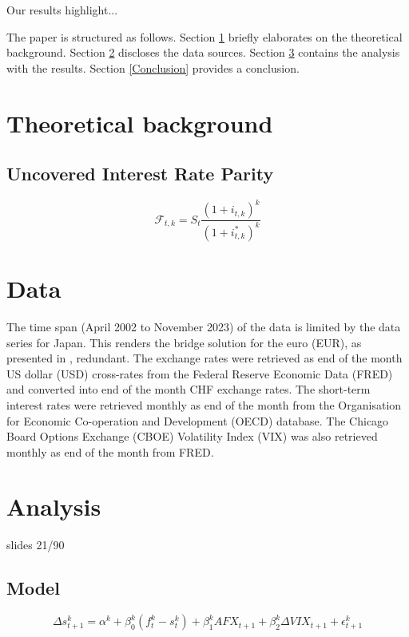 \documentclass[a4paper,11pt,oneside]{article}
\begin{document}


Our results highlight...\par

The paper is structured as follows. Section \ref{Theoretical background} briefly elaborates on the theoretical background. Section \ref{Data} discloses the data sources. Section \ref{Analysis} contains the analysis with the results. Section \ref{Conclusion} provides a conclusion.\par 

  
\section{Theoretical background}\label{Theoretical background}
\subsection{Uncovered Interest Rate Parity}\label{Uncovered Interest Rate Parity}
\begin{equation}\label{1}
\mathcal{F}_{t,k}=S_{t}\frac{(1+i_{t,k})^k}{(1+i_{t,k}^*)^k}
\end{equation}

\section{Data}\label{Data}
The time span (April 2002 to November 2023) of the data is limited by the data series for Japan. This renders the bridge solution for the euro (EUR), as presented in \cite{Grisse and Nitschka 2015}, redundant. The exchange rates were retrieved as end of the month US dollar (USD) cross-rates from the Federal Reserve Economic Data (FRED) and converted into end of the month CHF exchange rates. The short-term interest rates were retrieved monthly as end of the month from the Organisation for Economic Co-operation and Development (OECD) database. The Chicago Board Options Exchange (CBOE) Volatility Index (VIX) was also retrieved monthly as end of the month from FRED.\par
 


\section{Analysis}\label{Analysis}
slides 21/90
\subsection{Model}\label{Model}
\begin{equation}\label{2}
\Delta s_{t+1}^k=\alpha^k+\beta_{0}^k(f_{t}^k-s_{t}^k)+\beta_{1}^k AFX_{t+1}+\beta_{2}^k\Delta VIX_{t+1}+\epsilon_{t+1}^k
\end{equation}
\end{document}
